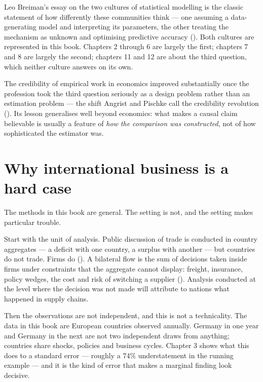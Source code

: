 \documentclass[
  letterpaper,
  10pt,
  twoside,
  openright,
  numbers=noenddot,
  chapterprefix=true]{scrbook}
\begin{document}
Leo Breiman's essay on the two cultures of statistical modelling is the
classic statement of how differently these communities think --- one
assuming a data-generating model and interpreting its parameters, the
other treating the mechanism as unknown and optimising predictive
accuracy (). Both cultures are
represented in this book. Chapters 2 through 6 are largely the first;
chapters 7 and 8 are largely the second; chapters 11 and 12 are about
the third question, which neither culture answers on its own.

The credibility of empirical work in economics improved substantially
once the profession took the third question seriously as a design
problem rather than an estimation problem --- the shift Angrist and
Pischke call the credibility revolution
(). Its
lesson generalises well beyond economics: what makes a causal claim
believable is usually a feature of \emph{how the comparison was
constructed}, not of how sophisticated the estimator was.

\section{Why international business is a hard
case}\label{why-international-business-is-a-hard-case}

The methods in this book are general. The setting is not, and the
setting makes particular trouble.

Start with the unit of analysis. Public discussion of trade is conducted
in country aggregates --- a deficit with one country, a surplus with
another --- but countries do not trade. Firms do
(). A bilateral flow is the sum
of decisions taken inside firms under constraints that the aggregate
cannot display: freight, insurance, policy wedges, the cost and risk of
switching a supplier ().
Analysis conducted at the level where the decision was not made will
attribute to nations what happened in supply chains.

Then the observations are not independent, and this is not a
technicality. The data in this book are European countries observed
annually. Germany in one year and Germany in the next are not two
independent draws from anything; countries share shocks, policies and
business cycles. Chapter 3 shows what this does to a standard error ---
roughly a 74\% understatement in the running example --- and it is the
kind of error that makes a marginal finding look decisive.
\end{document}
